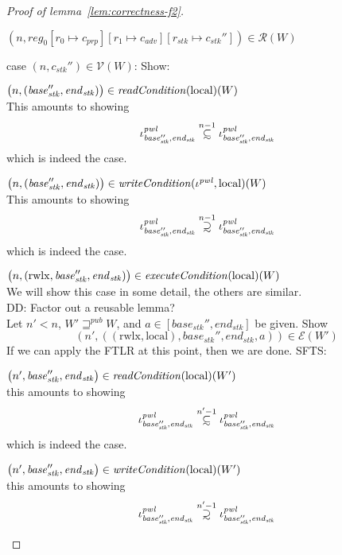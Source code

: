 \documentclass[a4paper]{article}
\newcommand{\update}[2]{[#1 \mapsto #2]}
\newcommand\subsetsim{\mathrel{\ooalign{\raise.2ex\hbox{$\subset$}\cr
      \hidewidth\lower.8ex\hbox{\scalebox{0.9}{$\sim$}}\hidewidth\cr}}}
\newcommand\supsetsim{\mathrel{\ooalign{\raise.2ex\hbox{$\supset$}\cr
      \hidewidth\lower.8ex\hbox{\scalebox{0.9}{$\sim$}}\hidewidth\cr}}}
\newcommand{\nsubsim}[1][n]{\stackrel{\tiny{#1}}{\subsetsim}}
\newcommand{\nsupsim}[1][n]{\stackrel{\tiny{#1}}{\supsetsim}}
\newcommand\dominique[1]{{\color{purple} \sf \footnotesize {DD: #1}}\\}
\newcommand{\var}[1]{\mathit{#1}}
\newcommand{\start}{\var{base}}
\newcommand{\addrend}{\var{end}}
\newcommand{\reg}{\var{reg}}
\newcommand{\adv}{\var{adv}}
\newcommand{\stk}{\var{stk}}
\newcommand{\pwl}{\var{pwl}}
\newcommand{\plainfun}[2]{
  \ifthenelse{\equal{#2}{}}
  {\mathit{#1}}
  {\mathit{#1}(#2)}
}
\newcommand{\readCond}[1]{\plainfun{readCondition}{#1}}
\newcommand{\writeCond}[1]{\plainfun{writeCondition}{#1}}
\newcommand{\execCond}[1]{\plainfun{executeCondition}{#1}}
\newcommand{\futurewk}{\mathbin{\sqsupseteq}^{\var{pub}}}
\newcommand{\asmType}{\plaindom{AsmType}}
\newcommand{\plaindom}[1]{\mathrm{#1}}
\newcommand{\intr}[2]{\mathcal{#1}}
\newcommand{\valueintr}[1]{\intr{V}{#1}}
\newcommand{\exprintr}[1]{\intr{E}{#1}}
\newcommand{\regintr}[1]{\intr{R}{#1}}
\newcommand{\stdvr}{\valueintr{\asmType}}
\newcommand{\stder}{\exprintr{\asmType}}
\newcommand{\stdrr}{\regintr{\asmType}}
\newcommand{\npair}[2][n]{\left(#1,#2 \right)}
\newcommand{\plainperm}[1]{\mathrm{#1}}
\newcommand{\rwlx}{\plainperm{rwlx}}
\newcommand{\local}{\plainperm{local}}
\begin{document}
\begin{proof}[Proof of lemma~\ref{lem:correctness-f2}]
\begin{enumproof}[resume]
\begin{itemize}
\begin{itemize}
      \end{itemize}
    \end{itemize}
  \item $\npair{\reg_0\update{r_0}{c_{\var{prp}}}\update{r_1}{c_\adv}\update{r_\stk}{c_\stk''}} \in \stdrr(W)$ \label{lem:f2-reg-rel}
    \begin{enumproof}
    \item case $\npair{c_\stk''} \in \stdvr(W)$: Show: \label{f2:stack-in-vr}
      \begin{enumproof}
      \item $\npair{(\start_\stk'', \addrend_\stk)} \in \readCond{}(\local)(W)$ \\
        This amounts to showing 
        \[
          \iota^\pwl_{\start_\stk'', \addrend_\stk} \nsubsim[n-1] \iota^\pwl_{\start_\stk'', \addrend_\stk}
        \]
        which is indeed the case.
      \item $\npair{(\start_\stk'', \addrend_\stk)} \in \writeCond{}(\iota^\pwl,\local)(W)$\\
        This amounts to showing 
        \[
          \iota^\pwl_{\start_\stk'', \addrend_\stk} \nsupsim[n-1] \iota^\pwl_{\start_\stk'', \addrend_\stk}
        \]
        which is indeed the case.
      \item $\npair{(\rwlx,\start_\stk'', \addrend_\stk)} \in \execCond{}(\local)(W)$ \label{f2:rwlx-exec-case} \\
        We will show this case in some detail, the others are similar. \\
        \dominique{Factor out a reusable lemma?}
        Let $n' < n$, $W' \futurewk W$, and $a \in [\start_\stk'', \addrend_\stk]$ be given. Show
        \[
          \npair[n']{((\rwlx,\local),\start_\stk'', \addrend_\stk,a)} \in \stder(W')
        \]
        If we can apply the FTLR at this point, then we are done. SFTS:
        \begin{enumproof}
        \item $\npair[n']{\start_\stk'', \addrend_\stk} \in \readCond{}(\local)(W')$\\
          this amounts to showing
          \[
            \iota^\pwl_{\start_\stk'', \addrend_\stk} \nsubsim[n'-1] \iota^\pwl_{\start_\stk'', \addrend_\stk}
          \]
          which is indeed the case.
        \item $\npair[n']{\start_\stk'', \addrend_\stk} \in \writeCond{}(\local)(W')$ \\
          this amounts to showing
          \[
            \iota^\pwl_{\start_\stk'', \addrend_\stk} \nsupsim[n'-1] \iota^\pwl_{\start_\stk'', \addrend_\stk}
\]
\end{enumproof}
\end{enumproof}
\end{enumproof}
\end{enumproof}
\end{proof}
\end{document}
